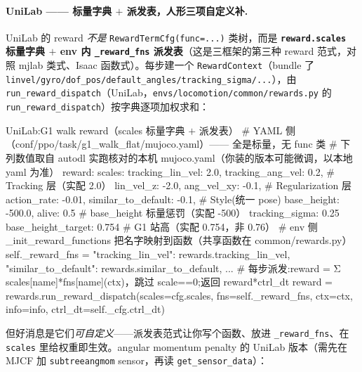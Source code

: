\paragraph{UniLab —— 标量字典 $+$ 派发表，人形三项自定义补.}
UniLab 的 reward \emph{不是} \texttt{RewardTermCfg(func=...)} 类树，而是 \textbf{\texttt{reward.\allowbreak scales} 标量字典 $+$ env 内 \texttt{\_reward\_fns} 派发表}（这是三框架的第三种 reward 范式，对照 mjlab 类式、Isaac 函数式）。每步建一个 \texttt{RewardContext}（bundle 了 \texttt{linvel/\allowbreak gyro/\allowbreak dof\_pos/\allowbreak default\_angles/\allowbreak tracking\_sigma/\allowbreak ...}），由 \texttt{run\_reward\_dispatch}（UniLab，\texttt{envs/\allowbreak locomotion/\allowbreak common/\allowbreak rewards.\allowbreak py} 的 \texttt{run\_reward\_dispatch}）按字典逐项加权求和：

\begin{codebox}[Python]{UniLab:G1 walk reward（scales 标量字典 $+$ 派发表）}
# YAML 侧（conf/ppo/task/g1_walk_flat/mujoco.yaml）—— 全是标量，无 func 类
# 下列数值取自 autodl 实跑核对的本机 mujoco.yaml（你装的版本可能微调，以本地 yaml 为准）
reward:
  scales: {tracking_lin_vel: 2.0, tracking_ang_vel: 0.2,   # Tracking 层（实配 2.0）
           lin_vel_z: -2.0, ang_vel_xy: -0.1,              # Regularization 层
           action_rate: -0.01, similar_to_default: -0.1,   # Style(统一 pose)
           base_height: -500.0, alive: 0.5}                # base_height 标量惩罚（实配 -500）
  tracking_sigma: 0.25
  base_height_target: 0.754                                # G1 站高（实配 0.754，非 0.76）
# env 侧 _init_reward_functions 把名字映射到函数（共享函数在 common/rewards.py）
self._reward_fns = {"tracking_lin_vel": rewards.tracking_lin_vel,
                    "similar_to_default": rewards.similar_to_default, ...}
# 每步派发:reward = Σ scales[name]*fns[name](ctx)，跳过 scale==0;返回 reward*ctrl_dt
reward = rewards.run_reward_dispatch(scales=cfg.scales, fns=self._reward_fns,
                                     ctx=ctx, info=info, ctrl_dt=self._cfg.ctrl_dt)
\end{codebox}

但好消息是它们\emph{可自定义}——派发表范式让你写个函数、放进 \texttt{\_reward\_fns}、在 \texttt{scales} 里给权重即生效。angular momentum penalty 的 UniLab 版本（需先在 MJCF 加 \texttt{subtreeangmom} sensor，再读 \texttt{get\_sensor\_data}）：

